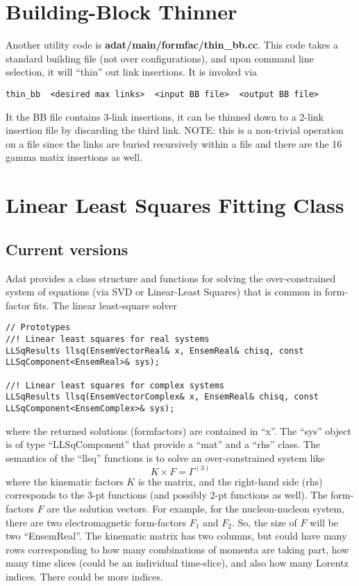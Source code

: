 \documentclass[11pt]{article}
\begin{document}
\section{Building-Block Thinner}
Another utility code is {\bf adat/main/formfac/thin\_bb.cc}. This code takes
a standard building file (not over configurations), and upon command line
selection, it will ``thin'' out link insertions. It is invoked via
\begin{verbatim}
thin_bb  <desired max links>  <input BB file>  <output BB file>
\end{verbatim}
It the BB file contains 3-link insertions, it can be thinned down to
a 2-link insertion file by discarding the third link. NOTE: this is a non-trivial
operation on a file since the links are buried recursively within a file and
there are the 16 gamma matix insertions as well.

\section{Linear Least Squares Fitting Class}\label{sec:llsq}

\subsection{Current versions}
Adat provides a class structure and functions for solving the
over-constrained system of equations (via SVD or Linear-Least Squares)
that is common in form-factor fits. The linear least-square solver
\begin{verbatim}
// Prototypes
//! Linear least squares for real systems
LLSqResults llsq(EnsemVectorReal& x, EnsemReal& chisq, const LLSqComponent<EnsemReal>& sys);

//! Linear least squares for complex systems
LLSqResults llsq(EnsemVectorComplex& x, EnsemReal& chisq, const LLSqComponent<EnsemComplex>& sys);
\end{verbatim}
where the returned solutions (formfactors) are contained in ``x''. The ``sys''
object is of type ``LLSqComponent'' that provide a ``mat'' and a ``rhs''
class. The semantics of the ``llsq'' functions is to solve an over-constrained
system like
\begin{equation}
K \times F = \Gamma^{(3)}
\end{equation}
where the kinematic factors $K$ is the matrix, and the right-hand side
(rhs) corresponds to the 3-pt functions (and possibly 2-pt functions
as well). The form-factors $F$ are the solution vectors. For example,
for the nucleon-nucleon system, there are two electromagnetic
form-factors $F_1$ and $F_2$. So, the size of $F$ will be two
``EnsemReal''. The kinematic matrix has two columns, but could have
many rows corresponding to how many combinations of momenta are taking
part, how many time slices (could be an individual time-slice), and
also how many Lorentz indices. There could be more indices.
\end{document}
